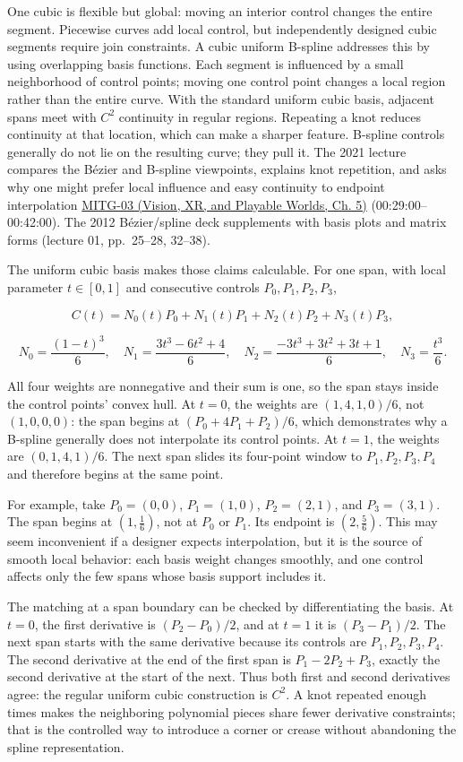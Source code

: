 One cubic is flexible but global: moving an interior control changes the entire segment. Piecewise curves add local control, but independently designed cubic segments require join constraints. A cubic uniform B-spline addresses this by using overlapping basis functions. Each segment is influenced by a small neighborhood of control points; moving one control point changes a local region rather than the entire curve. With the standard uniform cubic basis, adjacent spans meet with \(C^2\) continuity in regular regions. Repeating a knot reduces continuity at that location, which can make a sharper feature. B-spline controls generally do not lie on the resulting curve; they pull it. The 2021 lecture compares the Bézier and B-spline viewpoints, explains knot repetition, and asks why one might prefer local influence and easy continuity to endpoint interpolation \href{../07-Vision-XR-and-Playable-Worlds/main.pdf\#nameddest=04-visual-computing-ii-ch036-mitg-03---curves-and-surfaces}{MITG-03 (Vision, XR, and Playable Worlds, Ch. 5)} (00:29:00--00:42:00). The 2012 Bézier/spline deck supplements with basis plots and matrix forms (lecture 01, pp.~25--28, 32--38).

The uniform cubic basis makes those claims calculable. For one span, with local parameter \(t\in[0,1]\) and consecutive controls \(P_0,P_1,P_2,P_3\),

\[
C(t)=N_0(t)P_0+N_1(t)P_1+N_2(t)P_2+N_3(t)P_3,
\]

\[
N_0=\frac{(1-t)^3}{6},\quad N_1=\frac{3t^3-6t^2+4}{6},\quad
N_2=\frac{-3t^3+3t^2+3t+1}{6},\quad N_3=\frac{t^3}{6}.
\]

All four weights are nonnegative and their sum is one, so the span stays inside the control points' convex hull. At \(t=0\), the weights are \((1,4,1,0)/6\), not \((1,0,0,0)\): the span begins at \((P_0+4P_1+P_2)/6\), which demonstrates why a B-spline generally does not interpolate its control points. At \(t=1\), the weights are \((0,1,4,1)/6\). The next span slides its four-point window to \(P_1,P_2,P_3,P_4\) and therefore begins at the same point.

For example, take \(P_0=(0,0)\), \(P_1=(1,0)\), \(P_2=(2,1)\), and \(P_3=(3,1)\). The span begins at \((1,\frac16)\), not at \(P_0\) or \(P_1\). Its endpoint is \((2,\frac56)\). This may seem inconvenient if a designer expects interpolation, but it is the source of smooth local behavior: each basis weight changes smoothly, and one control affects only the few spans whose basis support includes it.

The matching at a span boundary can be checked by differentiating the basis. At \(t=0\), the first derivative is \((P_2-P_0)/2\), and at \(t=1\) it is \((P_3-P_1)/2\). The next span starts with the same derivative because its controls are \(P_1,P_2,P_3,P_4\). The second derivative at the end of the first span is \(P_1-2P_2+P_3\), exactly the second derivative at the start of the next. Thus both first and second derivatives agree: the regular uniform cubic construction is \(C^2\). A knot repeated enough times makes the neighboring polynomial pieces share fewer derivative constraints; that is the controlled way to introduce a corner or crease without abandoning the spline representation.

